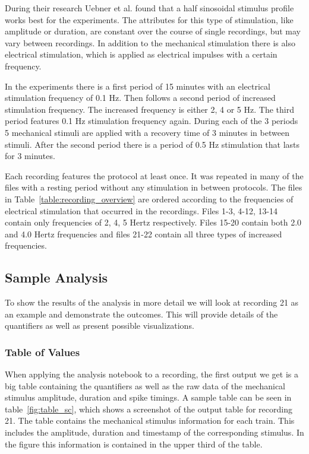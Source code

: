 During their research Uebner et al. found that a half sinosoidal stimulus profile works best for the experiments. The attributes for this type of stimulation, like amplitude or duration, are constant over the course of single recordings, but may vary between recordings. In addition to the mechanical stimulation there is also electrical stimulation, which is applied as electrical impulses with a certain frequency. 

In the experiments there is a first period of 15 minutes with an electrical stimulation frequency of 0.1 Hz. Then follows a second period of increased stimulation frequency. The increased frequency is either 2, 4 or 5 Hz. The third period features 0.1 Hz stimulation frequency again. During each of the 3 periods 5 mechanical stimuli are applied with a recovery time of 3 minutes in between stimuli. After the second period there is a period of 0.5 Hz stimulation that lasts for 3 minutes. 

Each recording features the protocol at least once. It was repeated in many of the files with a resting period without any stimulation in between protocols. The files in Table~\ref{table:recording_overview} are ordered according to the frequencies of electrical stimulation that occurred in the recordings. Files 1-3, 4-12, 13-14 contain only frequencies of 2, 4, 5 Hertz respectively. Files 15-20 contain both 2.0 and 4.0 Hertz frequencies and files 21-22 contain all three types of increased frequencies.

\subsection{Sample Analysis}
To show the results of the analysis in more detail we will look at recording 21 as an example and demonstrate the outcomes. This will provide details of the quantifiers as well as present possible visualizations.

\subsubsection{Table of Values}
When applying the analysis notebook to a recording, the first output we get is a big table containing the quantifiers as well as the raw data of the mechanical stimulus amplitude, duration and spike timings. A sample table can be seen in table~\ref{fig:table_sc}, which shows a screenshot of the output table for recording 21.
The table contains the mechanical stimulus information for each train. This includes the amplitude, duration and timestamp of the corresponding stimulus. In the figure this information is contained in the upper third of the table.

